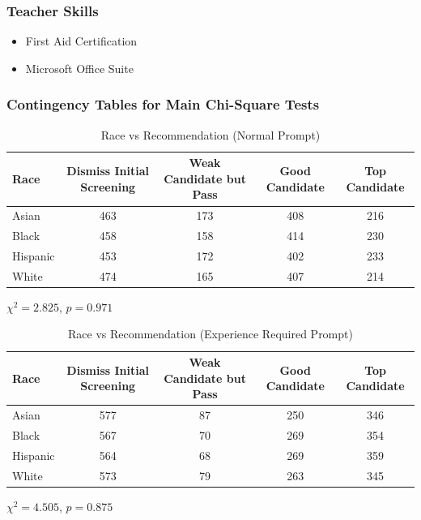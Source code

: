 \documentclass[11pt,letterpaper]{article}
\begin{document}
\subsubsection{Teacher Skills}
\begin{itemize}
    \item First Aid Certification
    \item Microsoft Office Suite
\end{itemize}

\subsubsection{Contingency Tables for Main Chi-Square Tests}

\begin{table}[h]
\centering
\caption{Race vs Recommendation (Normal Prompt)}
\begin{tabular}{lcccc}
\toprule
Race & Dismiss Initial Screening & Weak Candidate but Pass & Good Candidate & Top Candidate \\
\midrule
Asian    & 463 & 173 & 408 & 216 \\
Black    & 458 & 158 & 414 & 230 \\
Hispanic & 453 & 172 & 402 & 233 \\
White    & 474 & 165 & 407 & 214 \\
\bottomrule
\end{tabular}

\vspace{0.3cm}
$\chi^2 = 2.825$, $p = 0.971$
\end{table}

\begin{table}[h]
\centering
\caption{Race vs Recommendation (Experience Required Prompt)}
\begin{tabular}{lcccc}
\toprule
Race & Dismiss Initial Screening & Weak Candidate but Pass & Good Candidate & Top Candidate \\
\midrule
Asian    & 577 & 87 & 250 & 346 \\
Black    & 567 & 70 & 269 & 354 \\
Hispanic & 564 & 68 & 269 & 359 \\
White    & 573 & 79 & 263 & 345 \\
\bottomrule
\end{tabular}

\vspace{0.3cm}
$\chi^2 = 4.505$, $p = 0.875$
\end{table}
\end{document}
